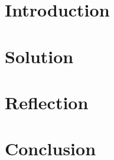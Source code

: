 \documentclass[notitlepage]{article}
\begin{document}
\section{Introduction}



\section{Solution}



\section{Reflection}



\section{Conclusion}



{}

\end{document}
